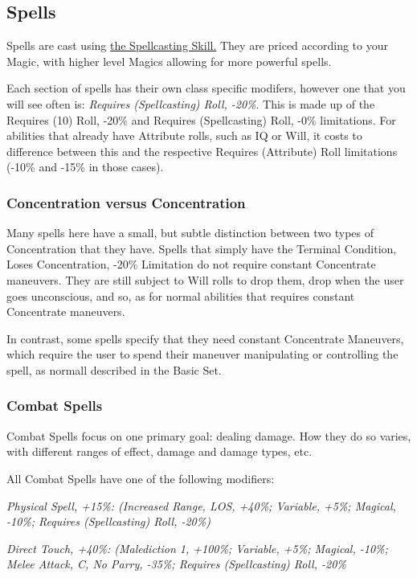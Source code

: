 \begin{multicols*}{3}
	\subsection{Spells}
	
	Spells are cast using \hyperref[spellcasting_skill]{the Spellcasting Skill.} They are priced according to your Magic, with higher level Magics allowing for more powerful spells.
	
	Each section of spells has their own class specific modifers, however one that you will see often is:	\textit{Requires (Spellcasting) Roll, -20\%}. This is made up of the Requires (10) Roll, -20\% and Requires (Spellcasting) Roll, -0\% limitations. For abilities that already have Attribute rolls, such as IQ or Will, it costs to difference between this and the respective Requires (Attribute) Roll limitations (-10\% and -15\% in those cases). 
	
	\subsubsection{Concentration versus Concentration}
	
	Many spells here have a small, but subtle distinction between two types of Concentration that they have. Spells that simply have the Terminal Condition, Loses Concentration, -20\% Limitation do not require constant Concentrate maneuvers. They are still subject to Will rolls to drop them, drop when the user goes unconscious, and so, as for normal abilities that requires constant Concentrate maneuvers.
	
	In contrast, some spells specify that they need constant Concentrate Maneuvers, which require the user to spend their maneuver manipulating or controlling the spell, as normall described in the Basic Set.
	
	\subsubsection{Combat Spells}
	
	Combat Spells focus on one primary goal: dealing damage. How they do so varies, with different ranges of effect, damage and damage types, etc.
	
	All Combat Spells have one of the following modifiers:
	
	\textcolor{OliveGreen}{\textit{Physical Spell, +15\%: (Increased Range, LOS, +40\%; Variable, +5\%; Magical, -10\%; Requires (Spellcasting) Roll, -20\%)}}
	
	\textcolor{OliveGreen}{\textit{Direct Touch, +40\%: (Malediction 1, +100\%; Variable, +5\%; Magical, -10\%; Melee Attack, C, No Parry, -35\%; Requires (Spellcasting) Roll, -20\%}}
	

\end{multicols*}
